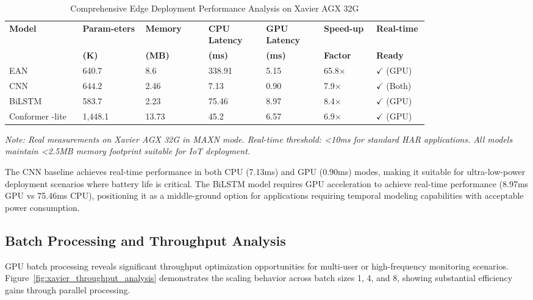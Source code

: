 \documentclass[lettersize,journal]{IEEEtran}
\begin{document}
\begin{table}[t]
\centering
\caption{Comprehensive Edge Deployment Performance Analysis on Xavier AGX 32G}
\label{tab:xavier_deployment_performance}
\footnotesize
\setlength{\tabcolsep}{2pt}
\begin{tabular}{p{0.14\linewidth} p{0.12\linewidth} p{0.12\linewidth} p{0.11\linewidth} p{0.11\linewidth} p{0.1\linewidth} p{0.1\linewidth}}
\toprule
\textbf{Model} & \textbf{Param-eters} & \textbf{Memory} & \textbf{CPU Latency} & \textbf{GPU Latency} & \textbf{Speed-up} & \textbf{Real-time} \\
 & \textbf{(K)} & \textbf{(MB)} & \textbf{(ms)} & \textbf{(ms)} & \textbf{Factor} & \textbf{Ready} \\
\midrule
EAN & 640.7 & 8.6 & 338.91 & 5.15 & 65.8× & $\checkmark$ (GPU) \\
CNN & 644.2 & 2.46 & 7.13 & 0.90 & 7.9× & $\checkmark$ (Both) \\
BiLSTM & 583.7 & 2.23 & 75.46 & 8.97 & 8.4× & $\checkmark$ (GPU) \\
Conformer -lite & 1,448.1 & 13.73 & 45.2 & 6.57 & 6.9× & $\checkmark$ (GPU) \\
\bottomrule
\end{tabular}
\textit{Note: Real measurements on Xavier AGX 32G in MAXN mode. Real-time threshold: <10ms for standard HAR applications. All models maintain <2.5MB memory footprint suitable for IoT deployment.}
\end{table}

The CNN baseline achieves real-time performance in both CPU (7.13ms) and GPU (0.90ms) modes, making it suitable for ultra-low-power deployment scenarios where battery life is critical. The BiLSTM model requires GPU acceleration to achieve real-time performance (8.97ms GPU vs 75.46ms CPU), positioning it as a middle-ground option for applications requiring temporal modeling capabilities with acceptable power consumption.

\subsection{Batch Processing and Throughput Analysis}

GPU batch processing reveals significant throughput optimization opportunities for multi-user or high-frequency monitoring scenarios. Figure~\ref{fig:xavier_throughput_analysis} demonstrates the scaling behavior across batch sizes 1, 4, and 8, showing substantial efficiency gains through parallel processing.
\end{document}
